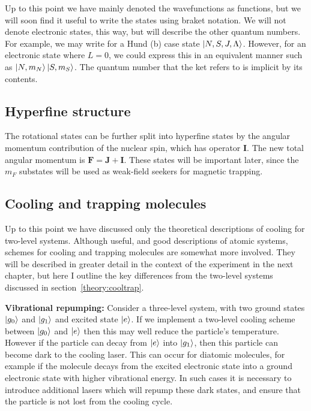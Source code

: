 Up to this point we have mainly denoted the wavefunctions as functions, but we
will soon find it useful to write the states using braket notation. We will not
denote electronic states, this way, but will describe the other quantum
numbers. For example, we may write for a Hund (b) case state $\ket{N, S, J,
\Lambda}$. However, for an electronic state where $L=0$, we could express this
in an equivalent manner such as $\ket{N, m_N}\ket{S, m_S}$. The
quantum number that the ket refers to is implicit by its contents.

\subsection{Hyperfine structure}

The rotational states can be further split into hyperfine states by the angular
momentum contribution of the nuclear spin, which has operator $\mathbf{I}$. The
new total angular momentum is  $\mathbf{F} = \mathbf{J} + \mathbf{I}$. These
states will be important later, since the $m_F$ substates will be used as
weak-field seekers for magnetic trapping.

\subsection{Cooling and trapping molecules}
\label{theory:coolmols}

Up to this point we have discussed only the theoretical descriptions of cooling
for two-level systems. Although useful, and good descriptions of atomic
systems, schemes for cooling and trapping molecules are somewhat more involved.
They will be described in greater detail in the context of the \CaF{}
experiment in the next chapter, but here I outline the key differences from the
two-level systems discussed in section~\ref{theory:cooltrap}.

\textbf{Vibrational repumping:} Consider a three-level system, with two ground
states $\ket{g_0}$ and $\ket{g_1}$ and excited state $\ket{e}$. If we implement
a two-level cooling scheme between $\ket{g_0}$ and $\ket{e}$ then this may well
reduce the particle's temperature. However if the particle can decay from
$\ket{e}$ into $\ket{g_1}$, then this particle can become dark to the cooling
laser. This can occur for diatomic molecules, for example if the molecule
decays from the excited electronic state into a ground electronic state with
higher vibrational energy. In such cases it is necessary to introduce
additional lasers which will repump these dark states, and ensure that the
particle is not lost from the cooling cycle.

